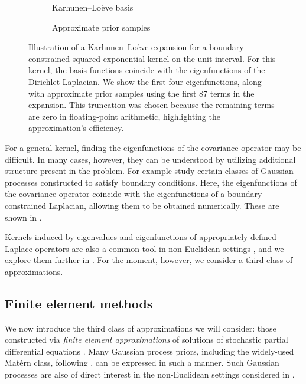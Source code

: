 \documentclass[11pt]{book}
\begin{document}
\begin{figure}
\begin{subfigure}{0.49\textwidth}

\caption{Karhunen--Loève basis}
\end{subfigure}
\begin{subfigure}{0.49\textwidth}

\caption{Approximate prior samples}
\end{subfigure}
\caption{Illustration of a Karhunen--Loève expansion for a boundary-constrained squared exponential kernel on the unit interval.
For this kernel, the basis functions coincide with the eigenfunctions of the Dirichlet Laplacian.
We show the first four eigenfunctions, along with approximate prior samples using the first 87 terms in the expansion. This truncation was chosen because the remaining terms are zero in floating-point arithmetic, highlighting the approximation's efficiency.}
\label{fig:gp-kl}
\end{figure}

For a general kernel, finding the eigenfunctions of the covariance operator may be difficult.
In many cases, however, they can be understood by utilizing additional structure present in the problem.
For example \textcite{solin19} study certain classes of Gaussian processes constructed to satisfy boundary conditions.
Here, the eigenfunctions of the covariance operator coincide with the eigenfunctions of a boundary-constrained Laplacian, allowing them to be obtained numerically.
These are shown in .

Kernels induced by eigenvalues and eigenfunctions of appropriately-defined Laplace operators are also a common tool in non-Euclidean settings \cite{solin18,solin20,coveney20}, and we explore them further in .
For the moment, however, we consider a third class of approximations.

\subsection{Finite element methods}

We now introduce the third class of approximations we will consider: those constructed via \emph{finite element approximations} of solutions of stochastic partial differential equations \cite{lord14,lototsky17,krainski18}.
Many Gaussian process priors, including the widely-used Matérn class, following \textcite{whittle54,whittle63,lindgren11}, can be expressed in such a manner.
Such Gaussian processes are also of direct interest in the non-Euclidean settings considered in .
\end{document}
